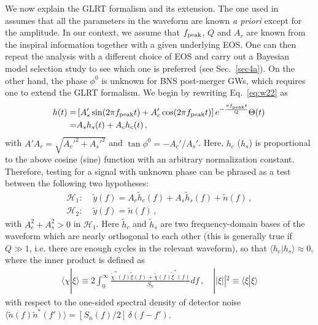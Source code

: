 \documentclass[prd,aps,floatfix,superscriptaddress,nofootinbib,twocolumn,10pt,English]{revtex4-1}
\begin{document}
We now explain the GLRT formalism and its extension. The one used 
in~\cite{yang2017black,Berti:2007zu,Berti:2016lat} assumes that 
all the parameters in the waveform are known \emph{a priori} except for the amplitude. 
In our context, we assume that $f_{\rm peak}$, $Q$ and $A_r$ are known from
the inspiral information together with a given underlying EOS.
One can then repeat the analysis with a different choice of EOS and carry out
a Bayesian model selection study to see which one is preferred (see Sec.~\ref{sec4a}).
On the other hand, the phase
$\phi^0$ is unknown for BNS post-merger GWs, which requires one to extend 
the GLRT formalism.
We begin by rewriting 
Eq.~\eqref{eq:w22} as
\begin{align}\label{eq:w22d}
h(t) = &\left [ A_s' \sin(2\pi f_{\rm peak} t) + A_c' \cos(2\pi f_{\rm peak} t)\right ] e^{- \frac{\pi f_{\rm peak} t}{Q}} \Theta(t)\,\nonumber \\
= & A_s h_s(t)+A_c h_c(t)\,,
\end{align}
with $A'A_r=\sqrt{A_c'^2+A_s'^2}$ and $\tan \phi^0
=-A_c'/A_s'$. Here, $h_c$ ($h_s$) is proportional to the above cosine
(sine) function with an arbitrary normalization constant.  Therefore,
testing for a signal with unknown phase can be phrased as a test between 
the following two hypotheses:
 \begin{align}
 \mathcal{H}_1: \,\, & \tilde y(f) =A_c \tilde h_c(f) +A_s \tilde h_s (f) +\tilde n(f)\,, \label{hypothesis1}\\
 \mathcal{H}_2: \,\, & \tilde y(f) = \tilde n(f) \,,
  \end{align}
with $A_c^2+A^2_s>0$ in $\mathcal{H}_1$. Here $\tilde h_c$ and $\tilde h_s$ are two
frequency-domain bases of the waveform which are
nearly orthogonal to each other (this is generally true if $Q \gg 1$, i.e. there are enough
cycles in the relevant waveform),
so that $\langle h_c |h_s \rangle \approx 0$, where the inner product is
defined as
\begin{align}
 \langle \chi | \xi\rangle \equiv 2 \int^\infty_0 \frac{\tilde \chi^*(f) \tilde \xi(f) +\tilde \chi(f) \tilde \xi^*(f)}{{S}_n} df\,,\quad ||\xi||^2 \equiv \langle \xi | \xi\rangle
 \end{align}
with respect to the one-sided spectral density of detector noise
$\langle \tilde n(f) \tilde n^*(f') \rangle =[S_n(f)/2] \,\delta (f-f')$.  
\end{document}
